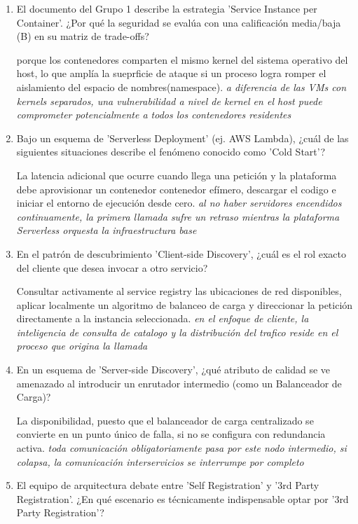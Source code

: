 \begin{enumerate}
\item El documento del Grupo 1 describe la estrategia 'Service Instance per Container'. ¿Por qué la seguridad se evalúa con una calificación media/baja (B) en su matriz de trade-offs?

porque los contenedores comparten el mismo kernel del sistema operativo del host, lo que amplía la sueprficie de ataque si un proceso logra romper el aislamiento del espacio de nombres(namespace). \textit{a diferencia de las VMs con kernels separados, una vulnerabilidad a nivel de kernel en el host puede comprometer potencialmente a todos los contenedores residentes}

\item Bajo un esquema de 'Serverless Deployment' (ej. AWS Lambda), ¿cuál de las siguientes situaciones describe el fenómeno conocido como 'Cold Start'?

La latencia adicional que ocurre cuando llega una petición y la plataforma debe aprovisionar un contenedor contenedor efímero, descargar el codigo e iniciar el entorno de ejecución desde cero. \textit{al no haber servidores encendidos continuamente, la primera llamada sufre un retraso mientras la plataforma Serverless orquesta la infraestructura base}

\item En el patrón de descubrimiento 'Client-side Discovery', ¿cuál es el rol exacto del cliente que desea invocar a otro servicio?

Consultar activamente al service registry las ubicaciones de red disponibles, aplicar localmente un algoritmo de balanceo de carga y direccionar la petición directamente a la instancia seleccionada. \textit{en el enfoque de cliente, la inteligencia de consulta de catalogo y la distribución del trafico reside en el proceso que origina la llamada}

\item En un esquema de 'Server-side Discovery', ¿qué atributo de calidad se ve amenazado al introducir un enrutador intermedio (como un Balanceador de Carga)?

La disponibilidad, puesto que el balanceador de carga centralizado se convierte en un punto único de falla, si no se configura con redundancia activa. \textit{toda comunicación obligatoriamente pasa por este nodo intermedio, si colapsa, la comunicación interservicios se interrumpe por completo}

\item El equipo de arquitectura debate entre 'Self Registration' y '3rd Party Registration'. ¿En qué escenario es técnicamente indispensable optar por '3rd Party Registration'?


\end{enumerate}
